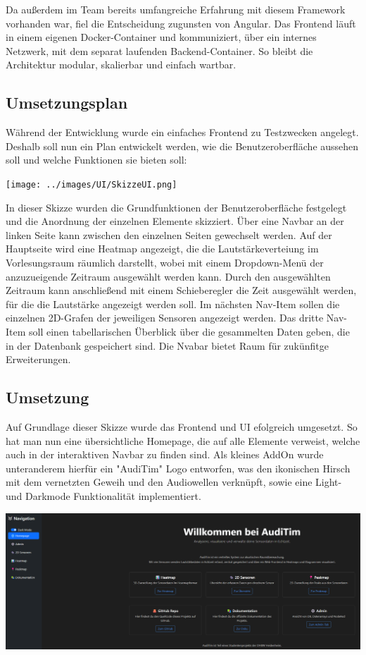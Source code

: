 Da außerdem im Team bereits umfangreiche Erfahrung mit diesem Framework vorhanden war, fiel die Entscheidung zugunsten von Angular.
Das Frontend läuft in einem eigenen Docker-Container und kommuniziert, über ein internes Netzwerk, mit dem separat laufenden Backend-Container. 
So bleibt die Architektur modular, skalierbar und einfach wartbar.

\subsection{Umsetzungsplan}
Während der Entwicklung wurde ein einfaches Frontend zu Testzwecken angelegt. 
Deshalb soll nun ein Plan entwickelt werden, wie die Benutzeroberfläche aussehen soll und welche Funktionen sie bieten soll:
\begin{center}
  \texttt{[image: ../images/UI/SkizzeUI.png]}
\end{center}
In dieser Skizze wurden die Grundfunktionen der Benutzeroberfläche festgelegt und die Anordnung der einzelnen Elemente skizziert.
Über eine Navbar an der linken Seite kann zwischen den einzelnen Seiten gewechselt werden. 
Auf der Hauptseite wird eine Heatmap angezeigt, die die Lautstärkeverteiung im Vorlesungsraum räumlich darstellt, wobei mit einem Dropdown-Menü der anzuzueigende Zeitraum ausgewählt werden kann.
Durch den ausgewählten Zeitraum kann anschließend mit einem Schieberegler die Zeit ausgewählt werden, für die die Lautstärke angezeigt werden soll.
Im nächsten Nav-Item sollen die einzelnen 2D-Grafen der jeweiligen Sensoren angezeigt werden. 
Das dritte Nav-Item soll einen tabellarischen Überblick über die gesammelten Daten geben, die in der Datenbank gespeichert sind.
Die Nvabar bietet Raum für zukünfitge Erweiterungen.

\subsection{Umsetzung}
Auf Grundlage dieser Skizze wurde das Frontend und UI efolgreich umgesetzt.
So hat man nun eine übersichtliche Homepage, die auf alle Elemente verweist, welche auch in der interaktiven Navbar zu finden sind.
Als kleines AddOn wurde unteranderem hierfür ein "AudiTim" Logo entworfen, was den ikonischen Hirsch mit dem vernetzten Geweih und den Audiowellen verknüpft, sowie eine Light- und Darkmode Funktionalität implementiert.
\begin{center}
  \includegraphics[width=1\textwidth]{../images/UI/homepage.png}
\end{center}

